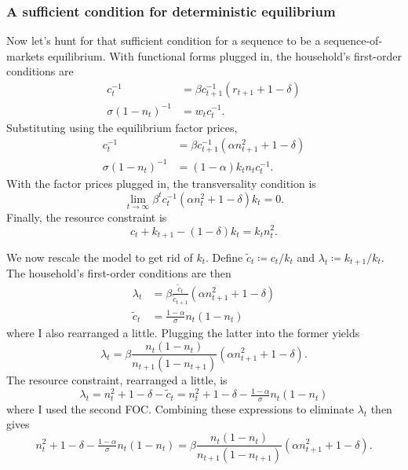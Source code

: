 \documentclass[11pt,letterpaper,reqno,oneside]{article}
\begin{document}
\subsubsection{A sufficient condition for deterministic equilibrium}
\label{sec:25Nov2015:sunspots_ChristianoHarrison1999:sufficient}

Now let's hunt for that sufficient condition for a sequence to be a sequence-of-markets equilibrium. With functional forms plugged in, the household's first-order conditions are
%
\begin{align*}
	c_t^{-1}
	&= \beta c_{t+1}^{-1} ( r_{t+1} + 1 - \delta )
	\\
	\sigma (1-n_t)^{-1} 
	&= w_t c_t^{-1} .
\end{align*}
%
Substituting using the equilibrium factor prices,
%
\begin{align*}
	c_t^{-1}
	&= \beta c_{t+1}^{-1} \left( \alpha n_{t+1}^2 + 1 - \delta \right)
	\\
	\sigma (1-n_t)^{-1} 
	&= (1-\alpha) k_t n_t c_t^{-1} .
\end{align*}
%
With the factor prices plugged in, the transversality condition is
%
\begin{equation*}
	\lim_{t \to \infty} 
	\beta^t c_t^{-1} \left( \alpha n_t^2 + 1 - \delta \right) k_t = 0 .
\end{equation*}
%
Finally, the resource constraint is
%
\begin{equation*}
	c_t + k_{t+1} - (1-\delta) k_t = k_t n_t^2 .
\end{equation*}


We now rescale the model to get rid of $k_t$. Define $\widetilde{c}_t \coloneqq c_t / k_t$ and $\lambda_t \coloneqq k_{t+1}/k_t$. The household's first-order conditions are then
%
\begin{align*}
	\lambda_t
	&= \beta \frac{\widetilde{c}_t}{\widetilde{c}_{t+1}}
	\left( \alpha n_{t+1}^2 + 1 - \delta \right)
	\\
	\widetilde{c}_t
	&= \tfrac{1-\alpha}{\sigma} n_t (1-n_t) 
\end{align*}
%
where I also rearranged a little. Plugging the latter into the former yields
%
\begin{equation*}
	\lambda_t
	= \beta \frac{n_t (1-n_t)}{n_{t+1} (1-n_{t+1}) }
	\left( \alpha n_{t+1}^2 + 1 - \delta \right) .
\end{equation*}
%
The resource constraint, rearranged a little, is
%
\begin{equation*}
	\lambda_t 
	= n_t^2 + 1 - \delta - \widetilde{c}_t
	= n_t^2 + 1 - \delta - \tfrac{1-\alpha}{\sigma} n_t (1-n_t) 
\end{equation*}
%
where I used the second FOC. Combining these expressions to eliminate $\lambda_t$ then gives
%
\begin{equation*}
	n_t^2 + 1 - \delta - \tfrac{1-\alpha}{\sigma} n_t (1-n_t) 
	= \beta \frac{n_t (1-n_t)}{n_{t+1} (1-n_{t+1}) }
	\left( \alpha n_{t+1}^2 + 1 - \delta \right) .
\end{equation*}
\end{document}
